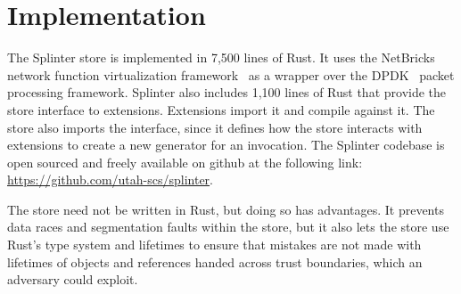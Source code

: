 \section{Implementation}
\label{sec:implementation}

The Splinter store is implemented in 7,500 lines of Rust. It uses the
  NetBricks network function virtualization framework~\cite{netbricks-2016} as a
  wrapper over the DPDK~\cite{dpdk} packet processing framework.
Splinter also includes 1,100 lines of Rust that
  provide the store interface to extensions. Extensions import it and
  compile against it.
The store also imports the interface, since it defines how the store interacts
  with extensions to create a new generator for an invocation.
The Splinter codebase is open sourced and freely available on github at
the following link:
\url{https://github.com/utah-scs/splinter}.

The store need not be written in Rust, but doing so has advantages.
It prevents data races and segmentation faults within the store, but
  it also lets the store use Rust's type system and lifetimes to ensure that
  mistakes are not made with lifetimes of objects and references
  handed across trust boundaries, which an adversary could exploit.
